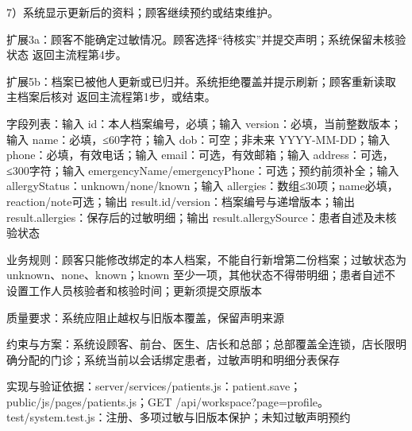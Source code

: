 \documentclass[UTF8,12pt,a4paper,fontset=none]{ctexart}
\begin{document}
7）系统显示更新后的资料；顾客继续预约或结束维护。\par
扩展3a：顾客不能确定过敏情况。顾客选择“待核实”并提交声明；系统保留未核验状态 返回主流程第4步。\par
扩展5b：档案已被他人更新或已归并。系统拒绝覆盖并提示刷新；顾客重新读取主档案后核对 返回主流程第1步，或结束。\par
字段列表：输入 id：本人档案编号，必填；输入 version：必填，当前整数版本；输入 name：必填，≤60字符；输入 dob：可空；非未来 YYYY-MM-DD；输入 phone：必填，有效电话；输入 email：可选，有效邮箱；输入 address：可选，≤300字符；输入 emergencyName/\allowbreak{}emergencyPhone：可选；预约前须补全；输入 allergyStatus：unknown/\allowbreak{}none/\allowbreak{}known；输入 allergies：数组≤30项；name必填，reaction/\allowbreak{}note可选；输出 result.\allowbreak{}id/\allowbreak{}version：档案编号与递增版本；输出 result.\allowbreak{}allergies：保存后的过敏明细；输出 result.\allowbreak{}allergySource：患者自述及未核验状态\par
业务规则：顾客只能修改绑定的本人档案，不能自行新增第二份档案；过敏状态为 unknown、none、known；known 至少一项，其他状态不得带明细；患者自述不设置工作人员核验者和核验时间；更新须提交原版本\par
质量要求：系统应阻止越权与旧版本覆盖，保留声明来源\par
约束与方案：系统设顾客、前台、医生、店长和总部；总部覆盖全连锁，店长限明确分配的门诊；系统当前以会话绑定患者，过敏声明和明细分表保存\par
实现与验证依据：server/\allowbreak{}services/\allowbreak{}patients.\allowbreak{}js：patient.\allowbreak{}save；public/\allowbreak{}js/\allowbreak{}pages/\allowbreak{}patients.\allowbreak{}js；GET /\allowbreak{}api/\allowbreak{}workspace?page=profile。test/\allowbreak{}system.\allowbreak{}test.\allowbreak{}js：注册、多项过敏与旧版本保护；未知过敏声明预约\par
{}
\end{document}
